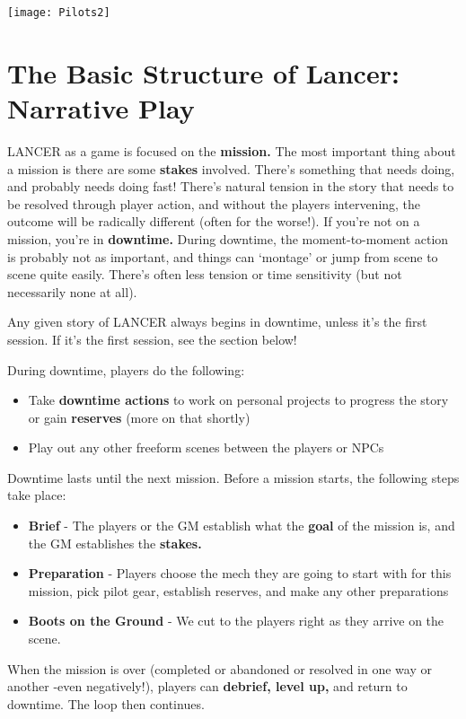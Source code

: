 \begin{center}
  \texttt{[image: Pilots2]}
\end{center}

\chapter{The Basic Structure of Lancer: Narrative Play}

LANCER as a game is focused on the \textbf{mission.} The most important thing about a mission is there are some \textbf{stakes} involved. There’s something that needs doing, and probably needs doing fast! There’s natural tension in the story that needs to be resolved through player action, and without the players intervening, the outcome will be radically different (often for the worse!). If you’re not on a mission, you’re in \textbf{downtime.} During downtime, the moment-to-moment action is probably not as important, and things can ‘montage’ or jump from scene to scene quite easily. There’s often less tension or time sensitivity (but not necessarily none at all).

Any given story of LANCER always begins in downtime, unless it’s the first session. If it’s the first session, see the section below!

During downtime, players do the following:
\begin{itemize}
\item Take \textbf{downtime actions} to work on personal projects to progress the story or gain \textbf{reserves} (more on that shortly)
\item Play out any other freeform scenes between the players or NPCs
\end{itemize}  

Downtime lasts until the next mission. Before a mission starts, the following steps take place:
\begin{itemize}
\item \textbf{Brief} - The players or the GM establish what the \textbf{goal} of the mission is, and the GM establishes the \textbf{stakes.}
\item \textbf{Preparation} - Players choose the mech they are going to start with for this mission, pick pilot gear, establish reserves, and make any other preparations
\item \textbf{Boots on the Ground} - We cut to the players right as they arrive on the scene.
\end{itemize}  

When the mission is over (completed or abandoned or resolved in one way or another -even negatively!), players can \textbf{debrief, level up,} and return to downtime. The loop then continues.

